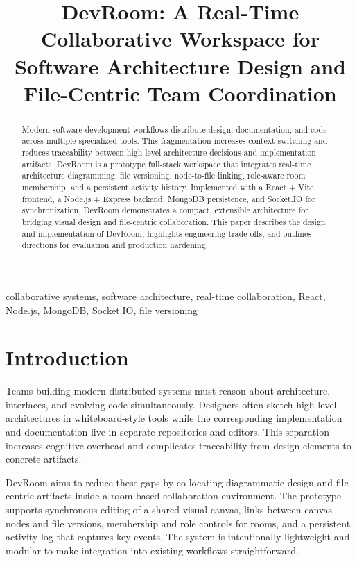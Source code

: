 \documentclass[conference]{IEEEtran}
\title{DevRoom: A Real-Time Collaborative Workspace for Software Architecture Design and File-Centric Team Coordination}
\author{
\IEEEauthorblockN{Author Name}
\IEEEauthorblockA{
Department or Institution Name \\
City, Country \\
email@example.com
}
}
\begin{document}
\maketitle

\begin{abstract}
Modern software development workflows distribute design, documentation, and code across multiple specialized tools. This fragmentation increases context switching and reduces traceability between high-level architecture decisions and implementation artifacts. DevRoom is a prototype full-stack workspace that integrates real-time architecture diagramming, file versioning, node-to-file linking, role-aware room membership, and a persistent activity history. Implemented with a React + Vite frontend, a Node.js + Express backend, MongoDB persistence, and Socket.IO for synchronization, DevRoom demonstrates a compact, extensible architecture for bridging visual design and file-centric collaboration. This paper describes the design and implementation of DevRoom, highlights engineering trade-offs, and outlines directions for evaluation and production hardening.
\end{abstract}

\begin{IEEEkeywords}
collaborative systems, software architecture, real-time collaboration, React, Node.js, MongoDB, Socket.IO, file versioning
\end{IEEEkeywords}

\section{Introduction}
Teams building modern distributed systems must reason about architecture, interfaces, and evolving code simultaneously. Designers often sketch high-level architectures in whiteboard-style tools while the corresponding implementation and documentation live in separate repositories and editors. This separation increases cognitive overhead and complicates traceability from design elements to concrete artifacts.

DevRoom aims to reduce these gaps by co-locating diagrammatic design and file-centric artifacts inside a room-based collaboration environment. The prototype supports synchronous editing of a shared visual canvas, links between canvas nodes and file versions, membership and role controls for rooms, and a persistent activity log that captures key events. The system is intentionally lightweight and modular to make integration into existing workflows straightforward.
\end{document}
